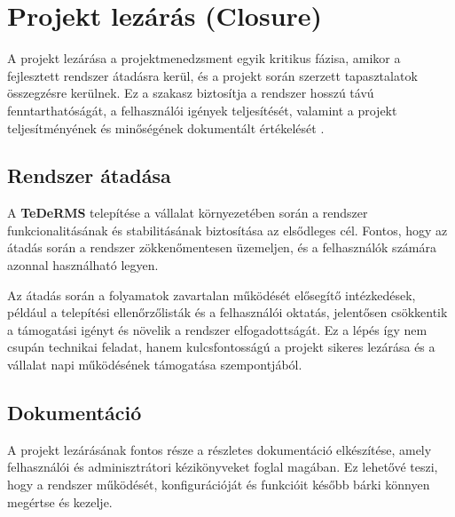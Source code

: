 \section{Projekt lezárás (Closure)}

A projekt lezárása a projektmenedzsment egyik kritikus fázisa, amikor a fejlesztett rendszer átadásra kerül, 
és a projekt során szerzett tapasztalatok összegzésre kerülnek.  
Ez a szakasz biztosítja a rendszer hosszú távú fenntarthatóságát, a felhasználói igények teljesítését, valamint 
a projekt teljesítményének és minőségének dokumentált értékelését \cite{Hajdu2014,Szalay2018,Kovacs2016,Kaposi2019}.

\subsection{Rendszer átadása}

A \textbf{TeDeRMS} telepítése a vállalat környezetében során a rendszer funkcionalitásának és stabilitásának biztosítása az elsődleges cél.  
Fontos, hogy az átadás során a rendszer zökkenőmentesen üzemeljen, és a felhasználók számára azonnal használható legyen.  

Az átadás során a folyamatok zavartalan működését elősegítő intézkedések, például a telepítési ellenőrzőlisták és 
a felhasználói oktatás, jelentősen csökkentik a támogatási igényt és növelik a rendszer elfogadottságát.  
Ez a lépés így nem csupán technikai feladat, hanem kulcsfontosságú a projekt sikeres lezárása és a vállalat napi működésének támogatása szempontjából.


\subsection{Dokumentáció}

A projekt lezárásának fontos része a részletes dokumentáció elkészítése, amely felhasználói és adminisztrátori kézikönyveket foglal magában.  
Ez lehetővé teszi, hogy a rendszer működését, konfigurációját és funkcióit később bárki könnyen megértse és kezelje.  

